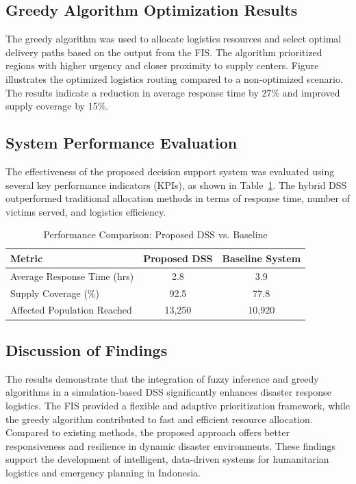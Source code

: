 \documentclass[journal,final,a4paper,twoside,11pt]{IEEEtran}
\begin{document}
\subsection{Greedy Algorithm Optimization Results}
The greedy algorithm was used to allocate logistics resources and select optimal delivery paths based on the output from the FIS. The algorithm prioritized regions with higher urgency and closer proximity to supply centers. Figure~ illustrates the optimized logistics routing compared to a non-optimized scenario. The results indicate a reduction in average response time by 27\% and improved supply coverage by 15\%.



\subsection{System Performance Evaluation}
The effectiveness of the proposed decision support system was evaluated using several key performance indicators (KPIs), as shown in Table~\ref{tab:performance}. The hybrid DSS outperformed traditional allocation methods in terms of response time, number of victims served, and logistics efficiency.

\begin{table}[htbp]
\caption{Performance Comparison: Proposed DSS vs. Baseline}
\begin{center}
\begin{tabular}{|l|c|c|}
\hline
\textbf{Metric} & \textbf{Proposed DSS} & \textbf{Baseline System} \\
\hline
Average Response Time (hrs) & 2.8 & 3.9 \\
Supply Coverage (\%) & 92.5 & 77.8 \\
Affected Population Reached & 13,250 & 10,920 \\
\hline
\end{tabular}
\label{tab:performance}
\end{center}
\end{table}

\subsection{Discussion of Findings}
The results demonstrate that the integration of fuzzy inference and greedy algorithms in a simulation-based DSS significantly enhances disaster response logistics. The FIS provided a flexible and adaptive prioritization framework, while the greedy algorithm contributed to fast and efficient resource allocation. Compared to existing methods, the proposed approach offers better responsiveness and resilience in dynamic disaster environments. These findings support the development of intelligent, data-driven systems for humanitarian logistics and emergency planning in Indonesia.
\end{document}
